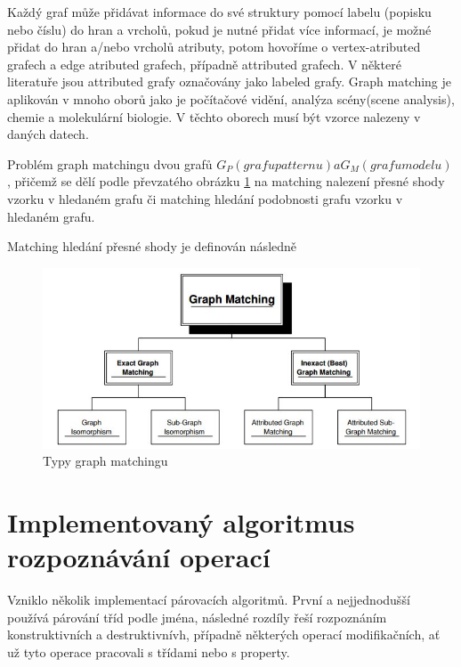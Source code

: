 \documentclass[11pt,twoside,a4paper]{book}
\begin{document}
 Každý graf může přidávat informace do své struktury pomocí labelu (popisku
 nebo číslu) do hran a vrcholů, pokud je nutné přidat více informací, je možné
 přidat do hran a/nebo vrcholů atributy, potom hovoříme o vertex-atributed
 grafech a edge atributed grafech, případně attributed grafech. V některé
 literatuře jsou attributed grafy označovány jako labeled grafy. Graph
 matching je aplikován v mnoho oborů jako je počítačové vidění, analýza
 scény(scene analysis), chemie a molekulární biologie. V těchto oborech musí být
 vzorce nalezeny v daných datech. 
  
 Problém graph matchingu dvou grafů $G_P (grafu patternu) a G_M (grafu modelu)$,
 přičemž se dělí podle převzatého obrázku \ref{fig:graph_matching} na matching nalezení přesné shody vzorku v hledaném
 grafu či matching hledání podobnosti grafu vzorku v hledaném grafu. 
 
 Matching hledání přesné shody je definován následně 
 
 
 \begin{figure}[ht]
\begin{center}
\includegraphics[width=15cm]{figures/graph_matching.jpg}
\caption{Typy graph matchingu}
\label{fig:graph_matching}
\end{center}
\end{figure}
 
 
 \section{Implementovaný algoritmus rozpoznávání operací}
 
 Vzniklo několik implementací párovacích algoritmů. První a nejjednodušší
 používá párování tříd podle jména, následné rozdíly řeší rozpoznáním
 konstruktivních a destruktivnívh, případně některých operací modifikačních, ať
 už tyto operace pracovali s třídami nebo s property.
 
\end{document}
